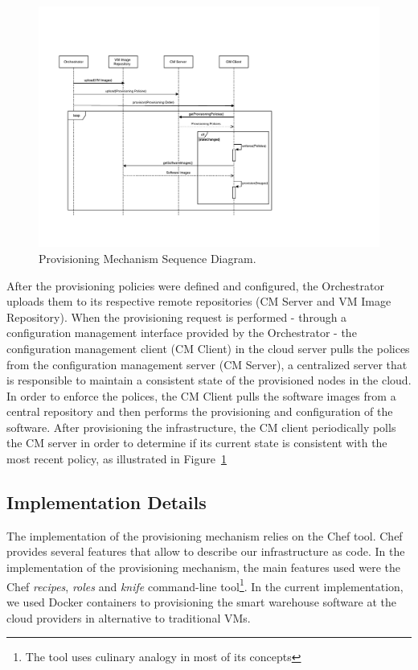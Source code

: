 \begin{figure}[ht!]
  \centering
  \includegraphics[width=\textwidth]{./images/provisioning_sequence}
  \caption[Provisioning Sequence Diagram]{Provisioning Mechanism Sequence Diagram.}
  \label{fig:provisioning_seq}
\end{figure}

After the provisioning policies were defined and configured, the Orchestrator uploads them to its respective
remote repositories (CM Server and VM Image Repository). When the provisioning request is performed -
through a configuration management interface provided by the Orchestrator - the configuration management
client (\gls{CM} Client) in the cloud server pulls the polices from the configuration management server
(\gls{CM} Server), a centralized server that is responsible to maintain a consistent state of the
provisioned nodes in the cloud. In order to enforce the polices, the \gls{CM} Client pulls the software
images from a central repository and then performs the provisioning and configuration of the software.
After provisioning the infrastructure, the CM client periodically polls the CM server in order to
determine if its current state is consistent with the most recent policy, as illustrated in Figure~\ref{fig:provisioning_seq}

\pagebreak

\subsection{Implementation Details}
\label{sub:Implementation Details}
The implementation of the provisioning mechanism relies on the Chef tool. Chef provides several features
that allow to describe our infrastructure as code. In the implementation of the provisioning mechanism,
the main features used were the Chef \textit{recipes}, \textit{roles} and \textit{knife} command-line
tool\footnote{The tool uses culinary analogy in most of its concepts}. In the current implementation,
we used Docker containers to provisioning the smart warehouse software at the cloud providers in
alternative to traditional \glspl{VM}.

